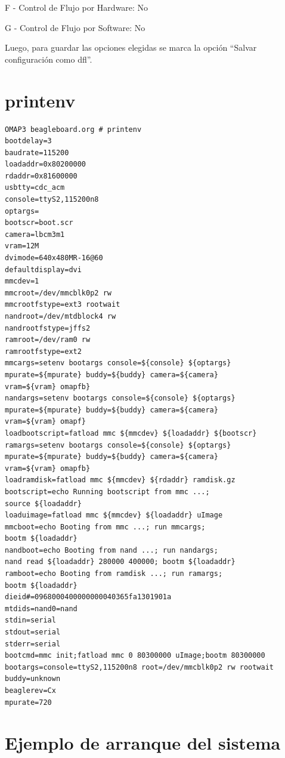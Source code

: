 F - Control de Flujo por Hardware: No 

G - Control de Flujo por Software: No 

\bigskip
Luego, para guardar las opciones elegidas se marca la opción “Salvar configuración como dfl”. 

\section{printenv}\label{printenv}

\begin{verbatim}
OMAP3 beagleboard.org # printenv
bootdelay=3 
baudrate=115200 
loadaddr=0x80200000 
rdaddr=0x81600000 
usbtty=cdc_acm 
console=ttyS2,115200n8 
optargs= 
bootscr=boot.scr 
camera=lbcm3m1 
vram=12M 
dvimode=640x480MR-16@60 
defaultdisplay=dvi 
mmcdev=1 
mmcroot=/dev/mmcblk0p2 rw 
mmcrootfstype=ext3 rootwait 
nandroot=/dev/mtdblock4 rw 
nandrootfstype=jffs2 
ramroot=/dev/ram0 rw 
ramrootfstype=ext2 
mmcargs=setenv bootargs console=${console} ${optargs}
mpurate=${mpurate} buddy=${buddy} camera=${camera} 
vram=${vram} omapfb} 
nandargs=setenv bootargs console=${console} ${optargs} 
mpurate=${mpurate} buddy=${buddy} camera=${camera} 
vram=${vram} omapf} 
loadbootscript=fatload mmc ${mmcdev} ${loadaddr} ${bootscr} 
ramargs=setenv bootargs console=${console} ${optargs} 
mpurate=${mpurate} buddy=${buddy} camera=${camera} 
vram=${vram} omapfb} 
loadramdisk=fatload mmc ${mmcdev} ${rdaddr} ramdisk.gz 
bootscript=echo Running bootscript from mmc ...; 
source ${loadaddr} 
loaduimage=fatload mmc ${mmcdev} ${loadaddr} uImage 
mmcboot=echo Booting from mmc ...; run mmcargs; 
bootm ${loadaddr} 
nandboot=echo Booting from nand ...; run nandargs; 
nand read ${loadaddr} 280000 400000; bootm ${loadaddr} 
ramboot=echo Booting from ramdisk ...; run ramargs; 
bootm ${loadaddr} 
dieid#=0968000400000000040365fa1301901a 
mtdids=nand0=nand 
stdin=serial 
stdout=serial 
stderr=serial 
bootcmd=mmc init;fatload mmc 0 80300000 uImage;bootm 80300000 
bootargs=console=ttyS2,115200n8 root=/dev/mmcblk0p2 rw rootwait 
buddy=unknown 
beaglerev=Cx 
mpurate=720
\end{verbatim}

\newpage
\section{Ejemplo de arranque del sistema}\label{arr}

